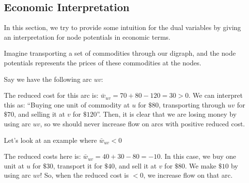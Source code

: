 \subsection{Economic Interpretation}
In this section, we try to provide some intuition for the dual variables by giving an interpretation for node potentials in economic terms.

Imagine transporting a set of commodities through our digraph, and the node potentials represents the prices of these commodities at the nodes.

Say we have the following arc $uv$:

\begin{minipage}{\textwidth}
\centering
{}
\end{minipage}

The reduced cost for this arc is: $\bar{w}_{uv} = 70 + 80 - 120 = 30 > 0$. We can interpret this as: ``Buying one unit of commodity at $u$ for $\$80$, transporting through $uv$ for $\$70$, and selling it at $v$ for $\$120$''. Then, it is clear that we are losing money by using arc $uv$, so we should never increase flow on arcs with positive reduced cost.

Let's look at an example where $\bar{w}_{uv} < 0$

\begin{minipage}{\textwidth}
\centering
{}
\end{minipage}

The reduced costs here is: $\bar{w}_{uv} = 40 + 30 - 80 = -10$. In this case, we buy one unit at $u$ for $\$30$, transport it for $\$40$, and sell it at $v$ for $\$80$. We make $\$10$ by using arc $uv$! So, when the reduced cost is $<0$, we increase flow on that arc.